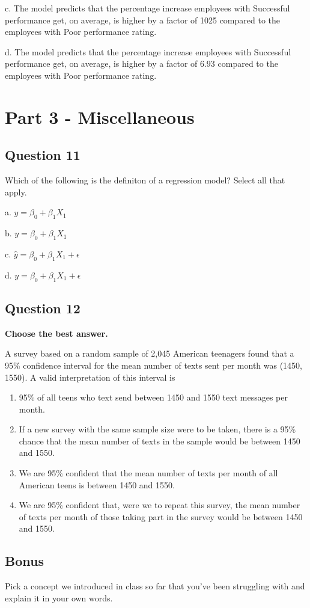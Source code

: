 \documentclass[
  letterpaper,
  DIV=11,
  numbers=noendperiod]{scrartcl}
\providecommand{\tightlist}{%
  \setlength{\itemsep}{0pt}\setlength{\parskip}{0pt}}\usepackage{longtable,booktabs,array}
\begin{document}
c. The model predicts that the percentage increase employees with
Successful performance get, on average, is higher by a factor of 1025
compared to the employees with Poor performance rating.

d. The model predicts that the percentage increase employees with
Successful performance get, on average, is higher by a factor of 6.93
compared to the employees with Poor performance rating.

\hypertarget{part-3---miscellaneous}{%
\section{Part 3 - Miscellaneous}\label{part-3---miscellaneous}}

\hypertarget{question-11}{%
\subsection{Question 11}\label{question-11}}

Which of the following is the definiton of a regression model? Select
all that apply.

a. \(\hat{y} = \beta_0 + \beta_1 X_1\)

b. \(y = \beta_0 + \beta_1 X_1\)

c. \(\hat{y} = \beta_0 + \beta_1 X_1 + \epsilon\)

d. \(y = \beta_0 + \beta_1 X_1 + \epsilon\)

\hypertarget{question-12}{%
\subsection{Question 12}\label{question-12}}

\textbf{Choose the best answer.}

A survey based on a random sample of 2,045 American teenagers found that
a 95\% confidence interval for the mean number of texts sent per month
was (1450, 1550). A valid interpretation of this interval is

\begin{enumerate}
\def\labelenumi{\alph{enumi}.}
\tightlist
\item
  95\% of all teens who text send between 1450 and 1550 text messages
  per month.
\item
  If a new survey with the same sample size were to be taken, there is a
  95\% chance that the mean number of texts in the sample would be
  between 1450 and 1550.
\item
  We are 95\% confident that the mean number of texts per month of all
  American teens is between 1450 and 1550.
\item
  We are 95\% confident that, were we to repeat this survey, the mean
  number of texts per month of those taking part in the survey would be
  between 1450 and 1550.
\end{enumerate}

\newpage{}

\hypertarget{bonus}{%
\subsection{Bonus}\label{bonus}}

Pick a concept we introduced in class so far that you've been struggling
with and explain it in your own words.
\end{document}
